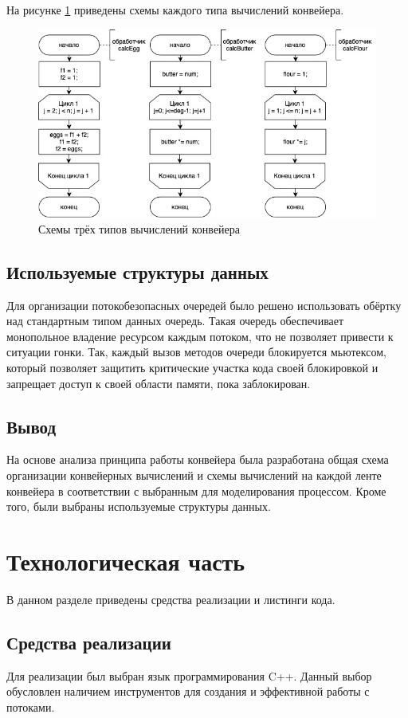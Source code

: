 \documentclass[12pt]{report}
\begin{document}
На рисунке \ref{fig:steps} приведены схемы каждого типа вычислений конвейера. 
\begin{figure}[h]
	\centering
	\includegraphics[width = \linewidth]{steps.jpg}
	\caption{Схемы трёх типов вычислений конвейера}
	\label{fig:steps}
\end{figure}

\section{Используемые структуры данных}
Для организации потокобезопасных очередей было решено использовать обёртку над стандартным типом данных очередь. Такая очередь обеспечивает монопольное владение ресурсом каждым потоком, что не позволяет привести к ситуации гонки. Так, каждый вызов методов очереди блокируется мьютексом, который позволяет защитить критические участка кода своей блокировкой и запрещает доступ к своей области памяти, пока заблокирован.
\section*{Вывод}
На основе анализа принципа работы конвейера была разработана общая схема организации конвейерных вычислений и схемы вычислений на каждой ленте конвейера в соответствии с выбранным для моделирования процессом. Кроме того, были выбраны используемые структуры данных.

\chapter{Технологическая часть}

В данном разделе приведены средства реализации и листинги кода.

\section{Средства реализации}
Для реализации был выбран язык программирования C++. Данный выбор обусловлен наличием инструментов для создания и эффективной работы с потоками. 
\end{document}
